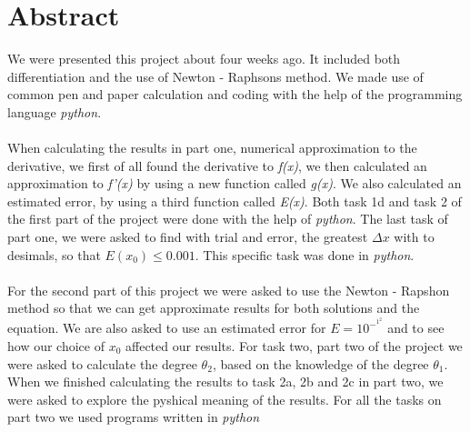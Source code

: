 \chapter*{Abstract}
We were presented this project about four weeks ago. It included both differentiation and the use of Newton - Raphsons method. We made use of common pen and paper calculation and coding with the help of the programming language \emph{python}. \\
\\
When calculating the results in part one, numerical approximation to the derivative, we first of all found the derivative to \emph{f(x)}, we then calculated an approximation to \emph{f'(x)} by using a new function called \emph{g(x)}. We also calculated an estimated error, by using a third function called \emph{E(x)}. Both task 1d and task 2 of the first part of the project were done with the help of \emph{python}. The last task of part one, we were asked to find with trial and error, the greatest $\Delta x$ with to desimals, so that $E(x_0) \leq 0.001$. This specific task was done in \emph{python}.\\
\\
For the second part of this project we were asked to use the Newton - Rapshon method so that we can get approximate results for both solutions and the equation. We are also asked to use an estimated error for $E = 10^-^1^2$ and to see how our choice of $x_0$ affected our results. For task two, part two of the project we were asked to calculate the degree $\theta_2$, based on the knowledge of the degree $\theta_1$. When we finished calculating the results to task 2a, 2b and 2c in part two, we were asked to explore the pyshical meaning of the results. For all the tasks on part two we used programs written in \emph{python}\\
\\

